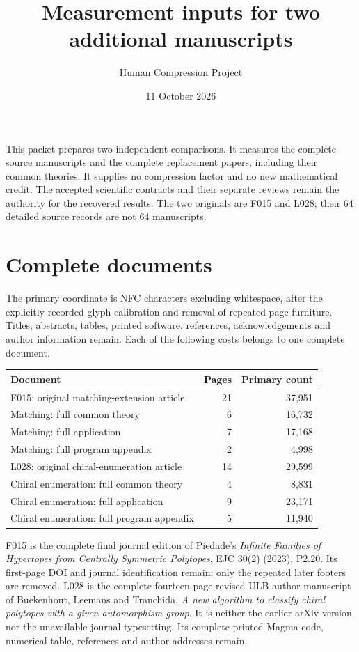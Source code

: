 \documentclass[11pt,a4paper]{article}
\title{Measurement inputs for two additional manuscripts}
\author{Human Compression Project}\date{11 October 2026}
\begin{document}
\maketitle
This packet prepares two independent comparisons. It measures the complete source manuscripts and the complete replacement papers, including their common theories. It supplies no compression factor and no new mathematical credit. The accepted scientific contracts and their separate reviews remain the authority for the recovered results. The two originals are F015 and L028; their 64 detailed source records are not 64 manuscripts.

\section*{Complete documents}
The primary coordinate is NFC characters excluding whitespace, after the explicitly recorded glyph calibration and removal of repeated page furniture. Titles, abstracts, tables, printed software, references, acknowledgements and author information remain. Each of the following costs belongs to one complete document.
\begin{center}\begin{tabular}{lrr}\toprule
Document & Pages & Primary count\\\midrule
F015: original matching-extension article&21&37,951\\
Matching: full common theory&6&16,732\\
Matching: full application&7&17,168\\
Matching: full program appendix&2&4,998\\\midrule
L028: original chiral-enumeration article&14&29,599\\
Chiral enumeration: full common theory&4&8,831\\
Chiral enumeration: full application&9&23,171\\
Chiral enumeration: full program appendix&5&11,940\\\bottomrule
\end{tabular}\end{center}
F015 is the complete final journal edition of Piedade's \emph{Infinite Families of Hypertopes from Centrally Symmetric Polytopes}, EJC 30(2) (2023), P2.20. Its first-page DOI and journal identification remain; only the repeated later footers are removed. L028 is the complete fourteen-page revised ULB author manuscript of Buekenhout, Leemans and Tranchida, \emph{A new algorithm to classify chiral polytopes with a given automorphism group}. It is neither the earlier arXiv version nor the unavailable journal typesetting. Its complete printed Magma code, numerical table, references and author addresses remain.
\end{document}

